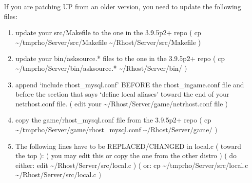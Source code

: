 \documentclass[letterpaper,10pt,english]{sphinxmanual}
\begin{document}
\sphinxAtStartPar
If you are patching UP from an older version, you need to update
the following files:
\begin{enumerate}
%
\item {} 
\sphinxAtStartPar
update your src/Makefile to the one in the 3.9.5p2+ repo
( cp \textasciitilde{}/tmprho/Server/src/Makefile \textasciitilde{}/Rhost/Server/src/Makefile )

\item {} 
\sphinxAtStartPar
update your bin/asksource.* files to the one in the 3.9.5p2+ repo
( cp \textasciitilde{}/tmprho/Server/bin/asksource.* \textasciitilde{}/Rhost/Server/bin/ )

\item {} 
\sphinxAtStartPar
append ‘include rhost\_mysql.conf’ BEFORE the rhost\_ingame.conf file
and before the section that says ‘define local aliases’ toward the end of
your netrhost.conf file.
( edit your \textasciitilde{}/Rhost/Server/game/netrhost.conf file )

\item {} 
\sphinxAtStartPar
copy the game/rhost\_mysql.conf file from the 3.9.5p2+ repo
( cp \textasciitilde{}/tmprho/Server/game/rhost\_mysql.conf \textasciitilde{}/Rhost/Server/game/ )

\item {} 
\sphinxAtStartPar
The following lines have to be REPLACED/CHANGED in local.c ( toward the top ):
( you may edit this or copy the one from the other distro )
( do either:  edit \textasciitilde{}/Rhost/Server/src/local.c )
(        or:  cp \textasciitilde{}/tmprho/Server/src/local.c \textasciitilde{}/Rhost/Server/src/local.c )

\end{enumerate}
\end{document}
